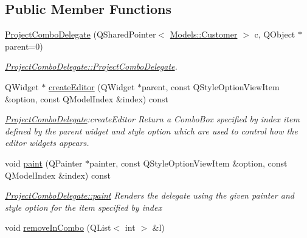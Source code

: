 \subsection*{Public Member Functions}
\begin{DoxyCompactItemize}
\item 
\hyperlink{classGui_1_1Widgets_1_1Delegates_1_1ProjectComboDelegate_a5fda87c3db87a0928717810a0ac2812f}{Project\+Combo\+Delegate} (Q\+Shared\+Pointer$<$ \hyperlink{classModels_1_1Customer}{Models\+::\+Customer} $>$ c, Q\+Object $\ast$parent=0)
\begin{DoxyCompactList}\small\item\em \hyperlink{classGui_1_1Widgets_1_1Delegates_1_1ProjectComboDelegate_a5fda87c3db87a0928717810a0ac2812f}{Project\+Combo\+Delegate\+::\+Project\+Combo\+Delegate}. \end{DoxyCompactList}\item 
Q\+Widget $\ast$ \hyperlink{classGui_1_1Widgets_1_1Delegates_1_1ProjectComboDelegate_adbfc28a3e6de34dc63d7290ae5b5c053}{create\+Editor} (Q\+Widget $\ast$parent, const Q\+Style\+Option\+View\+Item \&option, const Q\+Model\+Index \&index) const 
\begin{DoxyCompactList}\small\item\em \hyperlink{classGui_1_1Widgets_1_1Delegates_1_1ProjectComboDelegate}{Project\+Combo\+Delegate}\+:create\+Editor Return a Combo\+Box specified by {\itshape index} item defined by the {\itshape parent} widget and style {\itshape option} which are used to control how the editor widgets appears. \end{DoxyCompactList}\item 
void \hyperlink{classGui_1_1Widgets_1_1Delegates_1_1ProjectComboDelegate_a20cbc84d26b83083fdf7efecae3407cf}{paint} (Q\+Painter $\ast$painter, const Q\+Style\+Option\+View\+Item \&option, const Q\+Model\+Index \&index) const 
\begin{DoxyCompactList}\small\item\em \hyperlink{classGui_1_1Widgets_1_1Delegates_1_1ProjectComboDelegate_a20cbc84d26b83083fdf7efecae3407cf}{Project\+Combo\+Delegate\+::paint} Renders the delegate using the given {\itshape painter} and style {\itshape option} for the item specified by {\itshape index} \end{DoxyCompactList}\item 
\hypertarget{classGui_1_1Widgets_1_1Delegates_1_1ProjectComboDelegate_a2c063b4b737ff627696a1b247860cc4b}{}void \hyperlink{classGui_1_1Widgets_1_1Delegates_1_1ProjectComboDelegate_a2c063b4b737ff627696a1b247860cc4b}{remove\+In\+Combo} (Q\+List$<$ int $>$ \&l)\label{classGui_1_1Widgets_1_1Delegates_1_1ProjectComboDelegate_a2c063b4b737ff627696a1b247860cc4b}


\end{DoxyCompactItemize}
